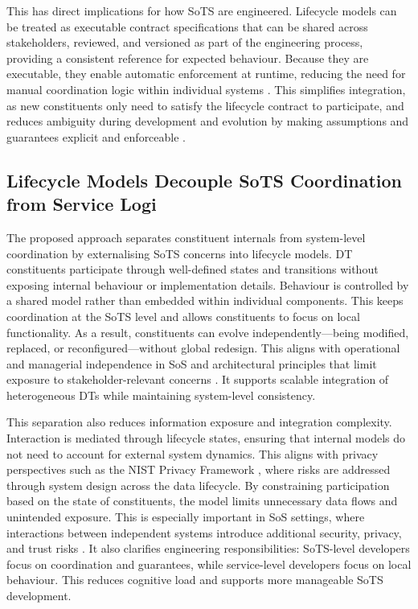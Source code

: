 This has direct implications for how SoTS are engineered. Lifecycle models can be treated as executable contract specifications that can be shared across stakeholders, reviewed, and versioned as part of the engineering process, providing a consistent reference for expected behaviour. Because they are executable, they enable automatic enforcement at runtime, reducing the need for manual coordination logic within individual systems \cite{sangiovanni2012taming}. This simplifies integration, as new constituents only need to satisfy the lifecycle contract to participate, and reduces ambiguity during development and evolution by making assumptions and guarantees explicit and enforceable \cite{waschle2021contract}.



\subsection{Lifecycle Models Decouple SoTS Coordination from Service Logi}
The proposed approach separates constituent internals from system-level coordination by externalising SoTS concerns into lifecycle models. DT constituents participate through well-defined states and transitions without exposing internal behaviour or implementation details. Behaviour is controlled by a shared model rather than embedded within individual components. This keeps coordination at the SoTS level and allows constituents to focus on local functionality. As a result, constituents can evolve independently---being modified, replaced, or reconfigured---without global redesign. This aligns with operational and managerial independence in SoS \cite{maier1998architecting} and architectural principles that limit exposure to stakeholder-relevant concerns \cite{iso42010}. It supports scalable integration of heterogeneous DTs while maintaining system-level consistency.

This separation also reduces information exposure and integration complexity. Interaction is mediated through lifecycle states, ensuring that internal models do not need to account for external system dynamics. This aligns with privacy perspectives such as the NIST Privacy Framework \cite{enterprise2020nist}, where risks are addressed through system design across the data lifecycle. By constraining participation based on the state of constituents, the model limits unnecessary data flows and unintended exposure. This is especially important in SoS settings, where interactions between independent systems introduce additional security, privacy, and trust risks \cite{olivero2024systematic}. It also clarifies engineering responsibilities: SoTS-level developers focus on coordination and guarantees, while service-level developers focus on local behaviour. This reduces cognitive load and supports more manageable SoTS development.


